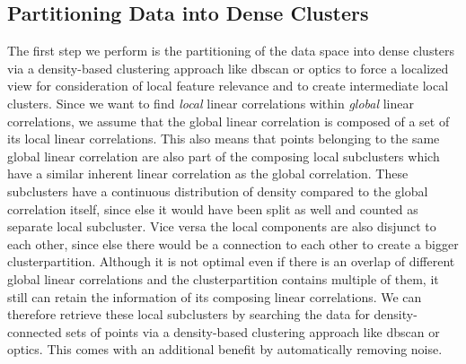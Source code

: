 \subsection{Partitioning Data into Dense Clusters}\label{ssec:partitioning}
The first step we perform is the partitioning of the data space into dense clusters via a density-based clustering approach like \gls{dbscan} or \gls{optics} to force a localized view for consideration of local feature relevance and to create intermediate local clusters. 
Since we want to find \textit{local} linear correlations within \textit{global} linear correlations, we assume that the global linear correlation is composed of a set of its local linear correlations. This also means that points belonging to the same global linear correlation are also part of the composing local subclusters which have a similar inherent linear correlation as the global correlation. These subclusters have a continuous distribution of density compared to the global correlation itself, since else it would have been split as well and counted as separate local subcluster. Vice versa the local components are also disjunct to each other, since else there would be a connection to each other to create a bigger clusterpartition. Although it is not optimal even if there is an overlap of different global linear correlations and the clusterpartition contains multiple of them, it still can retain the information of its composing linear correlations.
We can therefore retrieve these local subclusters by searching the data for density-connected sets of points via a density-based clustering approach like \gls{dbscan} or \gls{optics}. This comes with an additional benefit by automatically removing noise. 

